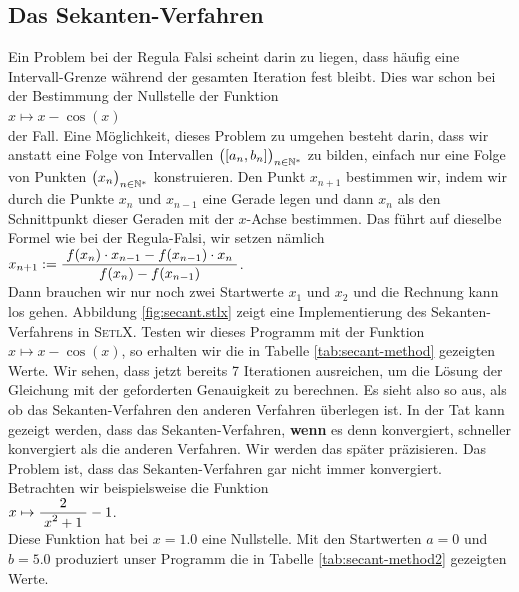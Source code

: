 \subsection{Das Sekanten-Verfahren}
Ein Problem bei der Regula Falsi scheint darin zu liegen, dass h\"aufig eine
Intervall-Grenze w\"ahrend der gesamten Iteration fest bleibt.  Dies war schon bei der
Bestimmung der Nullstelle der Funktion
\\[0.2cm]
\hspace*{1.3cm}
$x \mapsto x - \cos(x)$ 
\\[0.2cm]
der Fall.  Eine
M\"oglichkeit, dieses Problem zu umgehen besteht darin, dass wir anstatt eine Folge von
Intervallen $\bigl([a_n, b_n]\bigr)_{n\in\mathbb{N}^*}$ zu bilden, einfach nur eine Folge von Punkten
$\bigl(x_n\bigr)_{n\in\mathbb{N}^*}$ konstruieren.  Den Punkt $x_{n+1}$ bestimmen wir, indem wir durch die Punkte
$x_{n}$ und $x_{n-1}$ eine Gerade legen und dann $x_n$ als den Schnittpunkt dieser Geraden
mit der $x$-Achse bestimmen.  Das f\"uhrt auf dieselbe Formel wie bei der Regula-Falsi, wir
setzen n\"amlich
\\[0.2cm]
\hspace*{1.3cm}
$x_{n+1} := \displaystyle\frac{\;\displaystyle f(x_{n}) \cdot x_{n-1} - f(x_{n-1}) \cdot x_n\;}{\;\displaystyle f(x_{n}) - f(x_{n-1})\;}$.
\\[0.2cm]
Dann brauchen wir nur noch zwei Startwerte $x_1$ und $x_2$ und die Rechnung kann los gehen.
Abbildung \ref{fig:secant.stlx} zeigt eine Implementierung des Sekanten-Verfahrens in
\textsc{SetlX}.  Testen wir dieses Programm mit der Funktion $x \mapsto x - \cos(x)$, so
erhalten wir die in Tabelle \ref{tab:secant-method} gezeigten Werte.
Wir sehen, dass jetzt bereits 7 Iterationen ausreichen, um die L\"osung der Gleichung mit
der geforderten Genauigkeit zu berechnen.  Es sieht also so aus, als ob das
Sekanten-Verfahren den anderen Verfahren \"uberlegen ist.  In der Tat kann gezeigt werden, dass
das Sekanten-Verfahren, \textbf{wenn} es denn konvergiert, schneller konvergiert als die anderen
Verfahren. Wir werden das sp\"ater pr\"azisieren.  Das Problem ist, dass das Sekanten-Verfahren
gar nicht immer konvergiert.  Betrachten wir beispielsweise die Funktion 
\\[0.2cm]
\hspace*{1.3cm}
$x \mapsto \displaystyle\frac{\;\displaystyle2\;}{\;\displaystyle x^2 + 1\;} - 1$. 
\\[0.2cm]
Diese Funktion hat bei $x = 1.0$ eine Nullstelle.  Mit
den Startwerten $a = 0$ und $b = 5.0$ produziert unser Programm die in Tabelle
\ref{tab:secant-method2}
gezeigten Werte.



